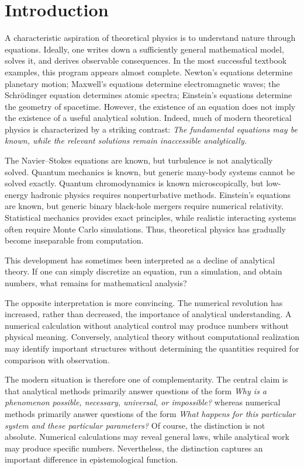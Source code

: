 \section{ Introduction}
\label{nm:in}

A characteristic aspiration of theoretical physics is to understand nature
through equations. Ideally, one writes down a sufficiently general mathematical
model, solves it, and derives observable consequences. In the most successful
textbook examples, this program appears almost complete. Newton's equations
determine planetary motion; Maxwell's equations determine electromagnetic
waves; the Schrödinger equation determines atomic spectra; Einstein's equations
determine the geometry of spacetime.
However, the existence of an equation does not imply the existence of a useful analytical solution.
Indeed, much of modern theoretical physics is characterized by a striking contrast:
\emph{The fundamental equations may be known, while the relevant solutions remain inaccessible analytically.}

The Navier--Stokes equations are known, but turbulence is not analytically
solved. Quantum mechanics is known, but generic many-body systems cannot be
solved exactly. Quantum chromodynamics is known microscopically, but low-energy
hadronic physics requires nonperturbative methods. Einstein's equations are
known, but generic binary black-hole mergers require numerical relativity.
Statistical mechanics provides exact principles, while realistic interacting
systems often require Monte Carlo simulations.
Thus, theoretical physics has gradually become inseparable from computation.

This development has sometimes been interpreted as a decline of analytical
theory. If one can simply discretize an equation, run a simulation, and obtain
numbers, what remains for mathematical analysis?

The opposite interpretation is more convincing. The numerical revolution has
increased, rather than decreased, the importance of analytical understanding. A
numerical calculation without analytical control may produce numbers without
physical meaning. Conversely, analytical theory without computational
realization may identify important structures without determining the
quantities required for comparison with observation.

The modern situation is therefore one of complementarity.
The central claim is that analytical methods primarily answer questions of the form
\emph{Why is a phenomenon possible, necessary, universal, or impossible?}
whereas numerical methods primarily answer questions of the form
\emph{What happens for this particular system and these particular parameters?}
Of course, the distinction is not absolute. Numerical calculations may reveal
general laws, while analytical work may produce specific numbers. Nevertheless,
the distinction captures an important difference in epistemological function.

